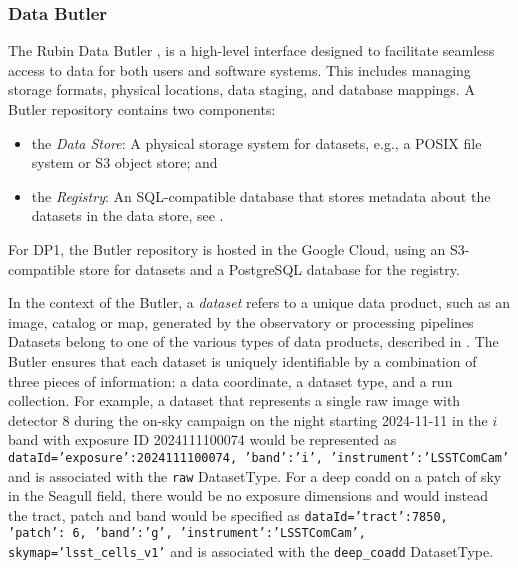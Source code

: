 \subsubsection{Data Butler
\label{sssec:data_butler}}

The Rubin Data Butler \citep{2022SPIE12189E..11J,2023arXiv230303313L},  is a high-level interface designed to facilitate seamless access to data for both users and software systems. 
This includes managing storage formats, physical locations, data staging, and database mappings.
A Butler repository contains two components:  
\begin{itemize}
    \item the \emph{Data Store}: A physical storage system for datasets, e.g., a POSIX file system or S3 object store; and
    \item the \emph{Registry}: An SQL-compatible database that stores metadata about the datasets in the data store, see . 
\end{itemize}
For DP1, the Butler repository is hosted in the Google Cloud, using an S3-compatible store for datasets and a PostgreSQL database for the registry. 

In the context of the Butler, a \emph{dataset} refers to a unique data product, such as an image, catalog or map, generated by the observatory or processing pipelines 
Datasets belong to one of the various types of data products, described in . 
The Butler ensures that each dataset is uniquely identifiable by a combination of three pieces of information: a data coordinate, a dataset type, and a run collection.
For example, a dataset that represents a single raw image with detector 8 during the on-sky campaign on the night starting 2024-11-11 in the $i$ band with exposure ID 2024111100074 would be represented as  \texttt{dataId={'exposure':2024111100074, 'band':'i', 'instrument':'LSSTComCam'}} and is associated with the \texttt{raw} DatasetType.
For a deep coadd on a patch of sky in the Seagull field, there would be no exposure dimensions and would instead the tract, patch and band would be specified as  \texttt{dataId={'tract':7850, 'patch': 6, 'band':'g', 'instrument':'LSSTComCam', skymap='lsst\_cells\_v1'}} and is associated with the \texttt{deep\_coadd} DatasetType.



